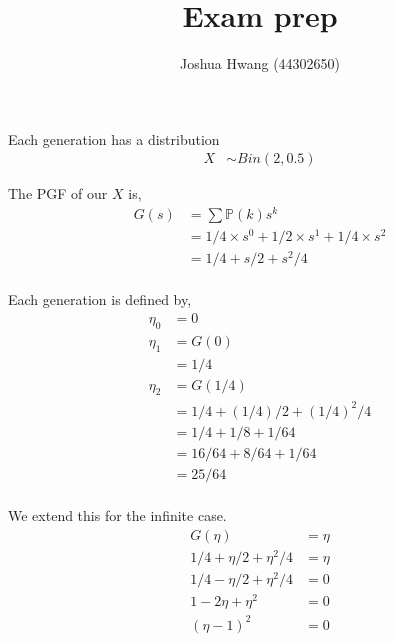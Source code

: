 \documentclass{article}
\title{Exam prep}
\author{Joshua Hwang (44302650)}
\newcommand{\prob}{\mathbb{P}}
\begin{document}
Each generation has a distribution
\begin{align*}
    X &\sim Bin(2,0.5)
\end{align*}

The PGF of our $X$ is,
\begin{align*}
    G(s) &= \sum \prob(k) s^k \\
    &= 1/4 \times s^0 + 1/2 \times s^1
    + 1/4 \times s^2 \\
    &= 1/4 + s/2 + s^2/4 \\
\end{align*}

Each generation is defined by,
\begin{align*}
    \eta_0 &= 0 \\
    \eta_1 &= G(0) \\
    &= 1/4 \\
    \eta_2 &= G(1/4) \\
    &= 1/4 + (1/4)/2 + (1/4)^2/4 \\
    &= 1/4 + 1/8 + 1/64 \\
    &= 16/64 + 8/64 + 1/64 \\
    &= 25/64 \\
\end{align*}

We extend this for the infinite case.
\begin{align*}
    G(\eta) &= \eta \\
    1/4 + \eta/2 + \eta^2/4 &= \eta \\
    1/4 - \eta/2 + \eta^2/4 &= 0 \\
    1 - 2\eta + \eta^2 &= 0 \\
    (\eta - 1)^2 &= 0 \\
\end{align*}
\end{document}
